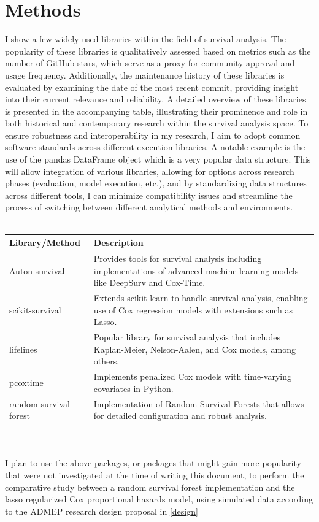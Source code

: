 \section{Methods} \label{methods}
I show a few widely used libraries within the field of survival analysis. The popularity of these libraries is qualitatively assessed based on metrics such as the number of GitHub stars, which serve as a proxy for community approval and usage frequency. Additionally, the maintenance history of these libraries is evaluated by examining the date of the most recent commit, providing insight into their current relevance and reliability. A detailed overview of these libraries is presented in the accompanying table, illustrating their prominence and role in both historical and contemporary research within the survival analysis space. To ensure robustness and interoperability in my research, I aim to adopt common software standards across different execution libraries. A notable example is the use of the pandas DataFrame object which is a very popular data structure. This will allow integration of various libraries, allowing for options across research phases (evaluation, model execution, etc.), and by standardizing data structures across different tools, I can minimize compatibility issues and streamline the process of switching between different analytical methods and environments.
\\\\
\noindent \begin{tabularx}{\textwidth}{|X|X|}
\hline
Library/Method & Description \\
\hline
Auton-survival \parencite{nagpal_auton-survival_2022} & Provides tools for survival analysis including implementations of advanced machine learning models like DeepSurv and Cox-Time. \\
\hline
scikit-survival \parencite{sebastian_polsterl_scikit-survival_2023} & Extends scikit-learn \parencite{scikit-learn} to handle survival analysis, enabling use of Cox regression models with extensions such as Lasso. \\
\hline
lifelines \parencite{davidson-pilon_lifelines_2024} & Popular library for survival analysis that includes Kaplan-Meier, Nelson-Aalen, and Cox models, among others. \\
\hline
pcoxtime \parencite{cygu_pcoxtime_2021} & Implements penalized Cox models with time-varying covariates in Python. \\
\hline
random-survival-forest \parencite{spath_julianspaethrandom-survival-forest_2021} & Implementation of Random Survival Forests that allows for detailed configuration and robust analysis. \\
\hline
\end{tabularx}
\\\\
\noindent I plan to use the above packages, or packages that might gain more popularity that were not investigated at the time of writing this document, to perform the comparative study between a random survival forest implementation and the lasso regularized Cox proportional hazards model, using simulated data according to the ADMEP research design proposal in \ref{design}


